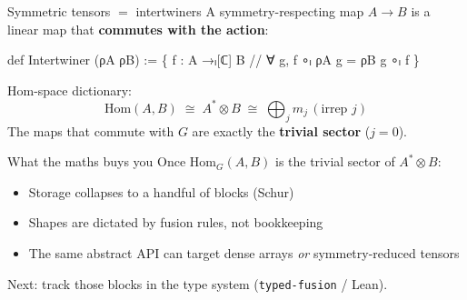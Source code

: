 \begin{frame}[fragile]{Symmetric tensors $=$ intertwiners}
  A symmetry-respecting map $A\to B$ is a linear map that
  \textbf{commutes with the action}:
  \vspace{0.4em}
\begin{semiverbatim}
def Intertwiner (ρA ρB) :=
  \{ f : A →ₗ[ℂ] B //
      ∀ g, f ∘ₗ ρA g = ρB g ∘ₗ f \}
\end{semiverbatim}
  \vspace{0.55em}
  Hom-space dictionary:
  \[
    \mathrm{Hom}(A,B)
    \;\cong\;
    A^{*}\otimes B
    \;\cong\;
    \bigoplus_{j} m_{j}\,
    (\text{irrep }j)
  \]
  The maps that commute with $G$ are exactly the
  \textbf{trivial sector} ($j{=}0$).
\end{frame}

\begin{frame}{What the maths buys you}
  Once $\mathrm{Hom}_G(A,B)$ is the trivial sector of
  $A^{*}\otimes B$:
  \begin{itemize}\setlength\itemsep{0.4em}
    \item Storage collapses to a handful of blocks
      (Schur)
    \item Shapes are dictated by fusion rules, not bookkeeping
    \item The same abstract API can target dense arrays
      \emph{or} symmetry-reduced tensors
  \end{itemize}

  \vspace{0.7em}
  {\small Next: track those blocks in the type system
  (\texttt{typed-fusion} / Lean).}
\end{frame}
